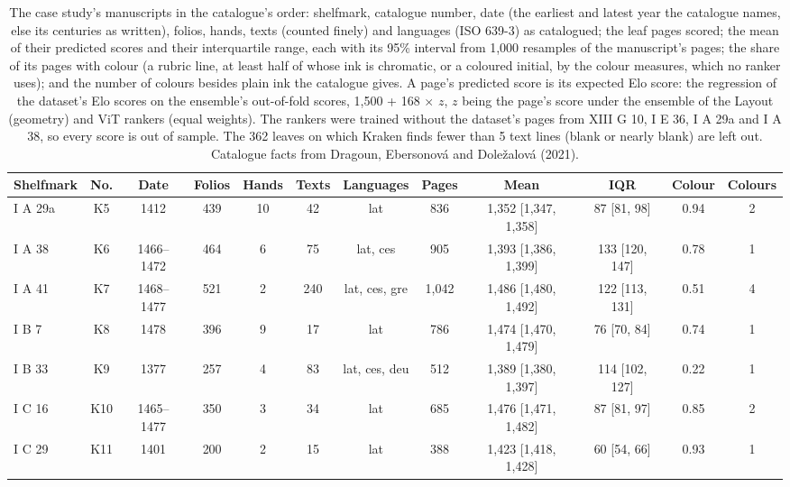 \begin{table}[htbp]
  \centering
  \footnotesize
  \caption{The case study's manuscripts in the catalogue's order: shelfmark, catalogue number, date (the earliest and latest year the catalogue names, else its centuries as written), folios, hands, texts (counted finely) and languages (ISO 639-3) as catalogued; the leaf pages scored; the mean of their predicted scores and their interquartile range, each with its 95\% interval from 1,000 resamples of the manuscript's pages; the share of its pages with colour (a rubric line, at least half of whose ink is chromatic, or a coloured initial, by the colour measures, which no ranker uses); and the number of colours besides plain ink the catalogue gives. A page's predicted score is its expected Elo score: the regression of the dataset's Elo scores on the ensemble's out-of-fold scores, 1,500 + 168 $\times$ $z$, $z$ being the page's score under the ensemble of the Layout (geometry) and ViT rankers (equal weights). The rankers were trained without the dataset's pages from XIII G 10, I E 36, I A 29a and I A 38, so every score is out of sample. The 362 leaves on which Kraken finds fewer than 5 text lines (blank or nearly blank) are left out. Catalogue facts from Dragoun, Ebersonová and Doležalová (2021).}
  \label{tab:crux_manuscripts}
  \begin{tabular}{lccccccccccc}
    \toprule
    Shelfmark & No. & Date & Folios & Hands & Texts & Languages & Pages & Mean & IQR & Colour & Colours \\
    \midrule
    I A 29a & K5 & 1412 & 439 & 10 & 42 & lat & 836 & 1,352 [1,347, 1,358] & 87 [81, 98] & 0.94 & 2 \\
    I A 38 & K6 & 1466--1472 & 464 & 6 & 75 & lat, ces & 905 & 1,393 [1,386, 1,399] & 133 [120, 147] & 0.78 & 1 \\
    I A 41 & K7 & 1468--1477 & 521 & 2 & 240 & lat, ces, gre & 1,042 & 1,486 [1,480, 1,492] & 122 [113, 131] & 0.51 & 4 \\
    I B 7 & K8 & 1478 & 396 & 9 & 17 & lat & 786 & 1,474 [1,470, 1,479] & 76 [70, 84] & 0.74 & 1 \\
    I B 33 & K9 & 1377 & 257 & 4 & 83 & lat, ces, deu & 512 & 1,389 [1,380, 1,397] & 114 [102, 127] & 0.22 & 1 \\
    I C 16 & K10 & 1465--1477 & 350 & 3 & 34 & lat & 685 & 1,476 [1,471, 1,482] & 87 [81, 97] & 0.85 & 2 \\
    I C 29 & K11 & 1401 & 200 & 2 & 15 & lat & 388 & 1,423 [1,418, 1,428] & 60 [54, 66] & 0.93 & 1 \\

\end{tabular}
\end{table}

